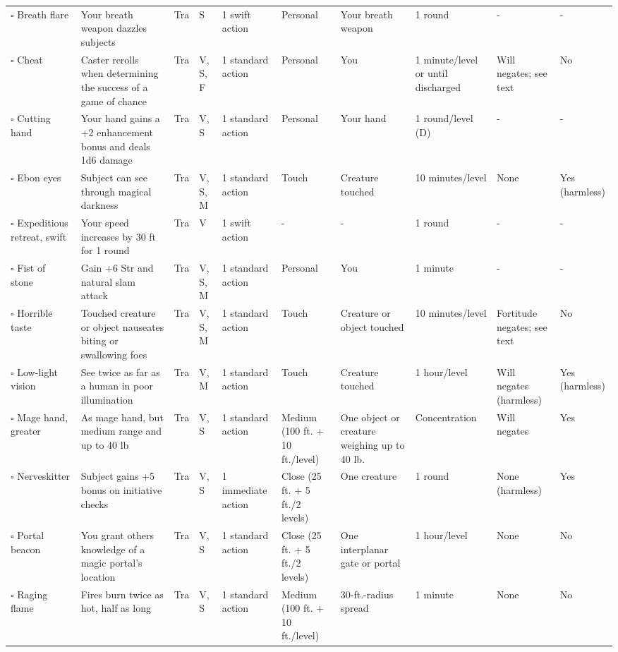 \documentclass[12pt, a4paper]{article}
\begin{document}
\begin{center}
\begin{longtable}[H]{ p{8em} p{15em} p{2em} p{5em} p{6em} p{6em} p{10em} p{6em} p{5em} p{2em} }
    \(\square\) Breath flare & Your breath weapon dazzles subjects & Tra & S & 1 swift action & Personal & Your breath weapon & 1 round & - & -\\
    \(\square\) Cheat & Caster rerolls when determining the success of a game of chance & Tra & V, S, F & 1 standard action & Personal & You & 1 minute/level or until discharged & Will negates; see text & No\\
    \(\square\) Cutting hand & Your hand gains a +2 enhancement bonus and deals 1d6 damage & Tra & V, S & 1 standard action & Personal & Your hand & 1 round/level (D) & - & -\\
    \(\square\) Ebon eyes & Subject can see through magical darkness & Tra & V, S, M & 1 standard action & Touch & Creature touched & 10 minutes/level & None & Yes (harmless)\\
    \(\square\) Expeditious retreat, swift & Your speed increases by 30 ft for 1 round & Tra & V & 1 swift action & - & - & 1 round & - & -\\
    \(\square\) Fist of stone & Gain +6 Str and natural slam attack & Tra & V, S, M & 1 standard action & Personal & You & 1 minute & - & -\\
    \(\square\) Horrible taste & Touched creature or object nauseates biting or swallowing foes & Tra & V, S, M & 1 standard action & Touch & Creature or object touched & 10 minutes/level & Fortitude negates; see text & No\\
    \(\square\) Low-light vision & See twice as far as a human in poor illumination & Tra & V, M & 1 standard action & Touch & Creature touched & 1 hour/level & Will negates (harmless) & Yes (harmless)\\
    \(\square\) Mage hand, greater & As mage hand, but medium range and up to 40 lb & Tra & V, S & 1 standard action & Medium (100 ft. + 10 ft./level) & One object or creature weighing up to 40 lb. & Concentration & Will negates & Yes\\
    \(\square\) Nerveskitter & Subject gains +5 bonus on initiative checks & Tra & V, S & 1 immediate action & Close (25 ft. + 5 ft./2 levels) & One creature & 1 round & None (harmless) & Yes\\
    \(\square\) Portal beacon & You grant others knowledge of a magic portal’s location & Tra & V, S & 1 standard action & Close (25 ft. + 5 ft./2 levels) & One interplanar gate or portal & 1 hour/level & None & No\\
    \(\square\) Raging flame & Fires burn twice as hot, half as long & Tra & V, S & 1 standard action & Medium (100 ft. + 10 ft./level) & 30-ft.-radius spread & 1 minute & None & No\\

\end{longtable}
\end{center}
\end{document}
